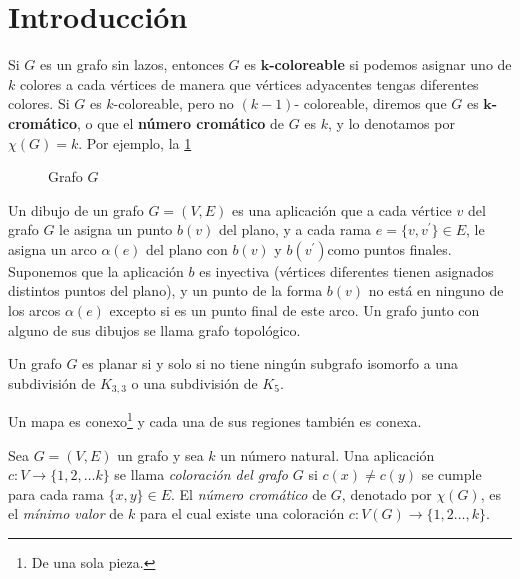 \documentclass[3p,times,a4paper,twocolumn,authoryear]{elsarticle} %
\begin{document}
\tableofcontents

\section{Introducción}
Si $G$ es un grafo sin lazos, entonces $G$ es \textbf{$\bm{k}$-coloreable} si podemos asignar uno de $k$ colores a cada vértices de manera que vértices adyacentes tengas diferentes colores. Si $G$ es $k$-coloreable, pero no $(k-1)$- coloreable, diremos que $G$ es \textbf{$\bm{k}$-cromático}, o que el \textbf{número cromático} de $G$ es $k$, y lo denotamos por $\chi(G)=k$. Por ejemplo, la \ref{fig:1.1}

\begin{figure}[H]
\centering
\scalebox{0.6}{}
\caption{Grafo $G$}\label{fig:1.1}
\end{figure}

\begin{definition}
Un dibujo de un grafo $G=(V,E)$ es una aplicación que a cada vértice $v$ del grafo $G$ le asigna un punto $b(v)$ del plano, y a cada rama $e=\{v,v^{\prime}\}\in E$, le asigna un arco $\alpha(e)$ del plano con $b(v)$ y $b(v^{\prime})$como puntos finales. Suponemos que la aplicación $b$ es inyectiva (vértices diferentes tienen asignados distintos puntos del plano), y un punto de la forma $b(v)$ no está en ninguno de los arcos $\alpha(e)$ excepto si es un punto final de este arco. Un grafo junto con alguno de sus dibujos se llama grafo topológico.
\end{definition}

\begin{theorem}
Un grafo $G$ es planar si y solo si no tiene ningún subgrafo isomorfo a una subdivisión de $K_{3,3}$ o una subdivisión de $K_5$.
\end{theorem}

\begin{definition}
Un mapa es conexo\footnote{De una sola pieza.} y cada una de sus regiones también es conexa.
\end{definition}

\begin{definition} 
Sea $G=(V,E)$ un grafo y sea $k$ un número natural. Una aplicación $c\colon V\to \{1,2,\ldots k\}$ se llama \emph{\color{DarkBlue}coloración del grafo} $G$ si $c(x)\neq c(y)$ se cumple para cada rama $\{x,y\}\in E$. \linebreak El \emph{\color{DarkBlue}número cromático} de $G$, denotado por $\chi(G)$, es el \emph{\color{red}mínimo valor} de $k$ para el cual existe una coloración $c\colon V(G)\to\{1,2\ldots,k\}$.
\end{definition}
\end{document}
